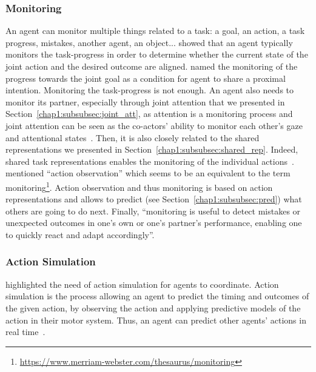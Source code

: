 \documentclass[a4paper,11pt,twoside]{StyleThese}
\begin{document}
\subsubsection{Monitoring}\label{chap1:subsubsec:monitoring}
An agent can monitor multiple things related to a task: a goal, an action, a task progress, mistakes, another agent, an object... \cite{vesper_2010_minimal} showed that an agent typically monitors the task-progress in order to determine whether the current state of the joint action and the desired outcome are aligned. \cite{pacherie_2012_agency} named the monitoring of the progress towards the joint goal as a condition for agent to share a proximal intention. Monitoring the task-progress is not enough. An agent also needs to monitor its partner, especially through joint attention that we presented in Section~\ref{chap1:subsubsec:joint_att}, as attention is a monitoring process and joint attention can be seen as the co-actors’ ability to monitor each other’s gaze and attentional states~\citep{emery_2000_eyes}. Then, it is also closely related to the shared representations we presented in Section~\ref{chap1:subsubsec:shared_rep}. Indeed, shared task representations enables the monitoring of the individual actions~\citep{knoblich_2011_joint}. \cite{sebanz_2006_joint} mentioned ``action observation'' which seems to be an equivalent to the term monitoring\footnote{\url{https://www.merriam-webster.com/thesaurus/monitoring}}. Action observation and thus monitoring is based on action representations and allows to predict (see Section~\ref{chap1:subsubsec:pred}) what others are going to do next. Finally, ``monitoring is useful to detect mistakes or unexpected outcomes in one's own or one's partner's performance, enabling one to quickly react and adapt accordingly''.

\subsubsection{Action Simulation}
\cite{sebanz_2009_prediction,knoblich_2011_joint} highlighted the need of action simulation for agents to coordinate. Action simulation is the process allowing an agent to predict the timing and outcomes of the given action, by observing the action and applying predictive models of the action in their motor system. Thus, an agent can predict other agents' actions in real time~\citep{wolpert_2003_unifying}.
\end{document}
